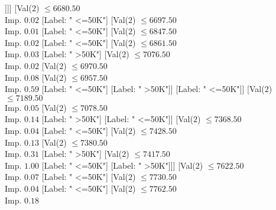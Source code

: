 \documentclass[margin=10pt]{standalone}
\begin{document}
\begin{forest}
																								[Label: " <=50K"]
																								[Val($2$) $ \leq 6428.50$ \\ Imp. $0.24$
																									[Label: " >50K"]
																									[Label: " <=50K"]]]]
																						[Val($2$) $ \leq 6680.50$ \\ Imp. $0.02$
																							[Label: " <=50K"]
																							[Val($2$) $ \leq 6697.50$ \\ Imp. $0.01$
																								[Label: " <=50K"]
																								[Val($2$) $ \leq 6847.50$ \\ Imp. $0.02$
																									[Label: " <=50K"]
																									[Val($2$) $ \leq 6861.50$ \\ Imp. $0.03$
																										[Label: " >50K"]
																										[Val($2$) $ \leq 7076.50$ \\ Imp. $0.02$
																											[Val($2$) $ \leq 6970.50$ \\ Imp. $0.08$
																												[Val($2$) $ \leq 6957.50$ \\ Imp. $0.59$
																													[Label: " <=50K"]
																													[Label: " >50K"]]
																												[Label: " <=50K"]]
																											[Val($2$) $ \leq 7189.50$ \\ Imp. $0.05$
																												[Val($2$) $ \leq 7078.50$ \\ Imp. $0.14$
																													[Label: " >50K"]
																													[Label: " <=50K"]]
																												[Val($2$) $ \leq 7368.50$ \\ Imp. $0.04$
																													[Label: " <=50K"]
																													[Val($2$) $ \leq 7428.50$ \\ Imp. $0.13$
																														[Val($2$) $ \leq 7380.50$ \\ Imp. $0.31$
																															[Label: " >50K"]
																															[Val($2$) $ \leq 7417.50$ \\ Imp. $1.00$
																																[Label: " <=50K"]
																																[Label: " >50K"]]]
																														[Val($2$) $ \leq 7622.50$ \\ Imp. $0.07$
																															[Label: " <=50K"]
																															[Val($2$) $ \leq 7730.50$ \\ Imp. $0.04$
																																[Label: " <=50K"]
																																[Val($2$) $ \leq 7762.50$ \\ Imp. $0.18$

\end{forest}
\end{document}
